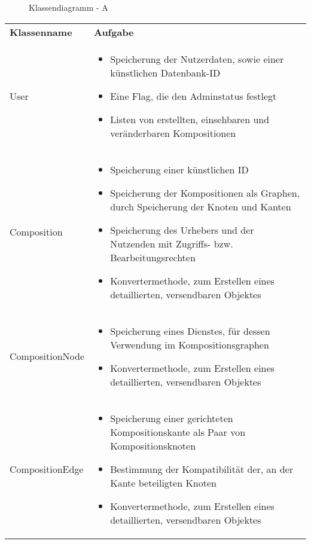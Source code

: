 \begin{figure}[h]
	\centering
	\caption{Klassendiagramm - A}
	\label{fig:klassendiagramm-a}
\end{figure}

\begin{table}[h]
	\centering
	\begin{tabularx}{\textwidth}{p{} | X}
		\rowcolor[HTML]{C0C0C0}
		\textbf{Klassenname} & \textbf{Aufgabe} \\
		User & \begin{itemize}
			\item Speicherung der Nutzerdaten, sowie einer künstlichen Datenbank-ID
			\item Eine Flag, die den Adminstatus festlegt
			\item Listen von erstellten, einsehbaren und veränderbaren Kompositionen
		\end{itemize}\\
		\rowcolor[HTML]{E7E7E7}
		Composition & \begin{itemize}
		  \item Speicherung einer künstlichen ID
			\item Speicherung der Kompositionen als Graphen, durch Speicherung der Knoten und Kanten
			\item Speicherung des Urhebers und der Nutzenden mit Zugriffs- bzw. Bearbeitungsrechten
			\item Konvertermethode, zum Erstellen eines detaillierten, versendbaren Objektes
		\end{itemize} \\
		CompositionNode & \begin{itemize}
			\item Speicherung eines Dienstes, für dessen Verwendung im Kompositionsgraphen
			\item Konvertermethode, zum Erstellen eines detaillierten, versendbaren Objektes
		\end{itemize} \\
		\rowcolor[HTML]{E7E7E7}
		CompositionEdge & \begin{itemize}
			\item Speicherung einer gerichteten Kompositionskante als Paar von Kompositionsknoten
			\item Bestimmung der Kompatibilität der, an der Kante beteiligten Knoten
			\item Konvertermethode, zum Erstellen eines detaillierten, versendbaren Objektes
		\end{itemize} \\

\end{tabularx}
\end{table}
